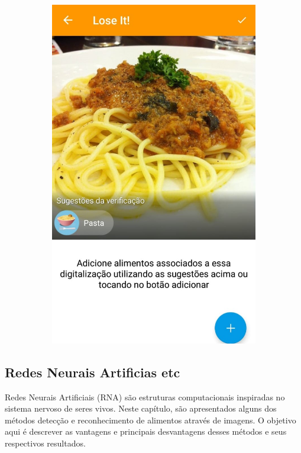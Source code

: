 \begin{figure}[!ht]
\begin{subfigure}{0.4\textwidth}
  \includegraphics[width=\textwidth]{imgs/loseit.jpeg}
  \label{fig:subApps2}
\end{subfigure}

\label{fig:test}
\end{figure}


\subsection{Redes Neurais Artificias etc \label{subsec:nn}}

Redes Neurais Artificiais (RNA) são estruturas computacionais inspiradas no sistema nervoso de seres vivos. 
Neste capítulo, são apresentados alguns dos métodos detecção e reconhecimento de alimentos através de imagens. O objetivo aqui é descrever as vantagens e principais desvantagens desses métodos e seus respectivos resultados. 


